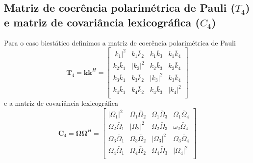 \subsection{Matriz de coerência polarimétrica de Pauli ($T_4$) e matriz de covariância lexicográfica ($C_4$)}

Para o caso biestático definimos a matriz de coerência polarimétrica de Pauli 
\begin{equation}\label{matriz_polar_pauli}
	\mathbf{T}_4=\mathbf{k}\mathbf{k}^H=	
\left[
\begin{array}{rrrr}
	|k_1|^2       & k_1\bar{k}_2  & k_1\bar{k}_3  & k_1\bar{k}_4  \\
	k_2\bar{k}_1  & |k_2|^2       & k_2\bar{k}_3  & k_2\bar{k}_4  \\
	k_3\bar{k}_1  & k_3\bar{k}_2  &    |k_3|^2    & k_3\bar{k}_4  \\
	k_4\bar{k}_1  & k_4\bar{k}_2  & k_4\bar{k}_3  & |k_4|^2   \\
\end{array}
\right]
\end{equation}
e a matriz de covariância lexicográfica
\begin{equation}\label{matriz_covar_lexic}
	\mathbf{C}_4=\mathbf{\Omega}\mathbf{\Omega}^H=	
\left[
\begin{array}{rrrr}
	|\Omega_1|^2       & \Omega_1\bar{\Omega}_2  & \Omega_1\bar{\Omega}_3  & \Omega_1\bar{\Omega}_4  \\
	\Omega_2\bar{\Omega}_1  & |\Omega_2|^2       & \Omega_2\bar{\Omega}_3  & \omega_2\bar{\Omega}_4  \\
	\Omega_3\bar{\Omega}_1  & \Omega_3\bar{\Omega}_2  &    |\Omega_3|^2    & \Omega_3\bar{\Omega}_4  \\
	\Omega_4\bar{\Omega}_1  & \Omega_4\bar{\Omega}_2  & \Omega_4\bar{\Omega}_3  & |\Omega_4|^2   \\
\end{array}
\right]
\end{equation}

